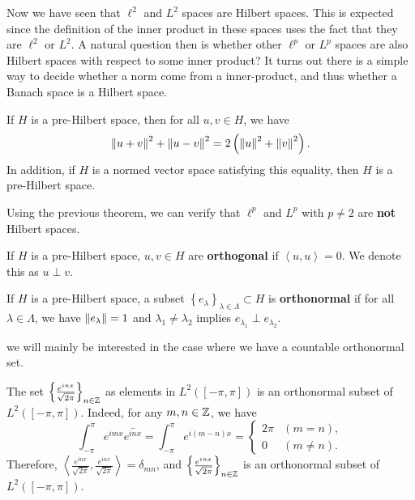 \documentclass[a4paper]{article}
\renewcommand{\braket}[2]{\left\langle #1, #1 \right\rangle}
\begin{document}
Now we have seen that $\ell^2$ and $L^2$ spaces are 
Hilbert spaces. This is expected since the definition 
of the inner product in these spaces uses the fact 
that they are $\ell^2$ or $L^2$. 
A natural question then is whether
other $\ell^p$ or $L^p$ spaces are also Hilbert spaces
with respect to some inner product?
It turns out there is a simple way to decide whether a 
norm come from a inner-product, and thus whether a 
Banach space is a Hilbert space. 

\begin{thm}
If $H$ is a pre-Hilbert space, then for all $u, v \in H$, 
we have 
\[
  \left\lVert u + v\right\rVert^2 + \left\lVert u - v\right\rVert^2 = 2 \left( \left\lVert u\right\rVert^2 
  + \left\lVert v\right\rVert^2 \right).
\]
In addition, if $H$ is a normed vector space satisfying this 
equality, then $H$ is a pre-Hilbert space.
\end{thm}

Using the previous theorem, we can verify that 
$\ell^p$ and $L^p$ with $p \neq 2$ are \textbf{not} 
Hilbert spaces.

\begin{defi}[Orthogonal]
  If $H$ is a pre-Hilbert space, $u, v \in H$ are 
  \textbf{orthogonal} if $\braket{u}{v} = 0$. 
  We denote this as $u \perp v$.
\end{defi}

\begin{defi}
  If $H$ is a pre-Hilbert space, a subset $\left\{ e_\lambda 
  \right\}_{\lambda \in \Lambda} \subset H$ is 
  \textbf{orthonormal} if for all $\lambda \in \Lambda$,
  we have $\left\lVert e_\lambda\right\rVert = 1$ and $\lambda_1 \neq \lambda_2$
  implies $e_{\lambda_1} \perp e_{\lambda_2}$.
\end{defi}

\begin{remark}
  we will mainly be interested in the case where we have a 
  countable orthonormal set.
\end{remark}

\begin{eg}
  The set $\left\{ \frac{e^{i n x}}{\sqrt{2\pi}} \right\}_{n \in \mathbb{Z}}$
  as elements in $L^2([-\pi, \pi])$ 
  is an orthonormal subset of $L^2([-\pi, \pi])$. 
  Indeed, for any $m, n \in \mathbb{Z}$, we have 
  \[
  \int_{-\pi}^\pi e^{imx} \bar{e^{inx}} 
  = \int_{-\pi}^\pi e^{i(m - n)x}
  = \begin{cases}
    2 \pi & (m = n), \\
    0 & (m \neq n).
  \end{cases}
  \]
  Therefore, $\braket{\frac{e^{inx}}{\sqrt{2\pi}}}{\frac{e^{imx}}
  {\sqrt{2\pi}}} = \delta_{mn}$, and $\left\{ \frac{e^{i n x}}{\sqrt{2\pi}}
  \right\}_{n \in \mathbb{Z}}$ is an orthonormal subset 
  of $L^2([-\pi, \pi])$.
\end{eg}
\end{document}
